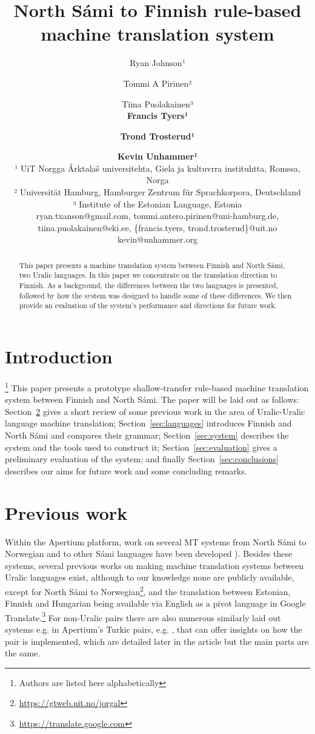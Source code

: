 \documentclass{flammie}
\title{North Sámi to Finnish rule-based machine translation system}
\author{Ryan Johnson¹ \and Tommi A Pirinen² \and Tiina Puolakainen³ \\ \textbf{Francis Tyers¹} \and \textbf{Trond Trosterud¹} \and \textbf{Kevin Unhammer¹}\\ 
¹ UiT Norgga \'Arktala\v{s} universitehta, Giela ja kultuvrra instituhtta, Romssa, Norga \\
² Universit\"{a}t Hamburg, Hamburger Zentrum f\"{u}r Sprachkorpora, Deutschland \\
³ Institute of the Estonian Language, Estonia\\
ryan.txanson@gmail.com, tommi.antero.pirinen@uni-hamburg.de, \\ tiina.puolakainen@eki.ee,
\{francis.tyers, trond.trosterud\}@uit.no \\
kevin@unhammer.org
}
\date{}
\begin{document}
\maketitle
\begin{abstract}
This paper presents a machine translation system between Finnish and North Sámi, two Uralic languages.
In this paper we concentrate on the translation direction to Finnish.
%
As a background, the differences between the two languages is presented, followed by how the system was designed to handle some of these differences.
We then provide an evaluation of the system's performance and directions for future work.
\end{abstract}

% 
%

\section{Introduction}
\label{sec:introduction}
\footnote[0]{Authors are listed here alphabetically}
This paper presents a prototype shallow-transfer rule-based machine translation system between Finnish and North Sámi.
The paper will be laid out as follows: Section\ \ref{sec:previous-work} gives a short review of some previous work in the area of Uralic-Uralic language machine translation; Section\ \ref{sec:languages} introduces Finnish and North Sámi and compares their grammar; Section\ \ref{sec:system} describes the system and the tools used to construct it; Section\ \ref{sec:evaluation} gives a preliminary evaluation of the system; and finally Section\ \ref{sec:conclusions} describes our aims for future work and some concluding remarks.

\section{Previous work}
\label{sec:previous-work}

Within the Apertium platform, work on several MT systems from North Sámi to Norwegian and to other Sámi languages have been developed \cite{tyers09,wiechetek10,trosterud12,smesma}).
Besides these systems, several previous works on making machine translation systems between Uralic languages exist, although to our knowledge none are publicly available, except for North Sámi to Norwegian\footnote{\url{https://gtweb.uit.no/jorgal}}, and the translation between Estonian, Finnish and Hungarian being available via English as a pivot language in Google Translate.\footnote{\url{https://translate.google.com}}
For non-Uralic pairs there are also numerous similarly laid out systems e.g. in Apertium's Turkic pairs, e.g. \cite{salimzyanov2013free}, that can offer insights on how the pair is implemented, which are detailed later in the article but the main parts are the same. 
\end{document}

